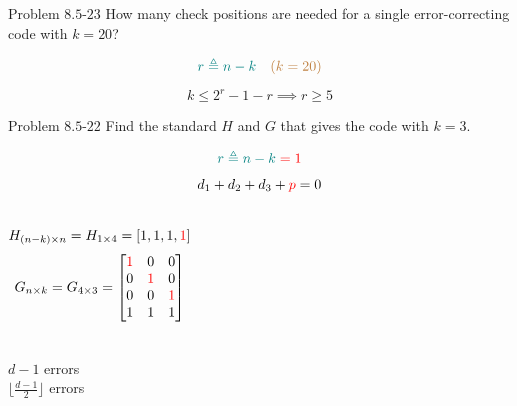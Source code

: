 \begin{frame}{}
  \begin{exampleblock}{Problem $8.5$-$23$}
	How many check positions are needed for a single error-correcting code with $k = 20$?
  \end{exampleblock}

  \pause
  \[
	\textcolor{teal}{r \triangleq n - k} \quad \textcolor{brown}{(k = 20)}
  \]

  \[
	k \le 2^r - 1 - r \implies r \ge 5
  \]
\end{frame}

\begin{frame}{}
  \begin{exampleblock}{Problem $8.5$-$22$}
	Find the standard $H$ and $G$ that gives the  code with $k = 3$.
  \end{exampleblock}

  \pause
  \[
	\textcolor{teal}{r \triangleq n - k} \;\textcolor{red}{= 1}
  \]

  \pause
  \[
	d_1 + d_2 + d_3 + \textcolor{red}{p} = 0
  \]

  \begin{columns}
	  \pause
	  \[
		H_{(n-k) \times n} = H_{1 \times 4} = [1, 1, 1, \textcolor{red}{1}]
	  \]
	  \pause
	  \[
		G_{n \times k} = G_{4 \times 3} = 
		\begin{bmatrix}
		  \textcolor{red}{1} & 0 & 0  \\
		  0 & \textcolor{red}{1} & 0  \\
		  0 & 0 & \textcolor{red}{1}  \\
		  1 & 1 & 1 \\
		\end{bmatrix}
	  \]
  \end{columns}
\end{frame}

\begin{frame}
  \begin{center}
	 $d-1$ errors \\[6pt]
	 $\lfloor \frac{d-1}{2} \rfloor$ errors
  \end{center}

\end{frame}

